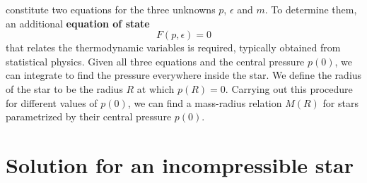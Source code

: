  constitute two equations for the three unknowns $p$, $\epsilon$ and $m$.
To determine them, an additional \textbf{equation of state}
\begin{equation}
	F(p, \epsilon) = 0
\end{equation}
that relates the thermodynamic variables is required, typically obtained from statistical physics.
Given all three equations and the central pressure $p(0)$, we can integrate to find the pressure everywhere inside the star.
We define the radius of the star to be the radius $R$ at which $p(R) = 0$.
Carrying out this procedure for different values of $p(0)$, we can find a mass-radius relation $M(R)$ for stars parametrized by their central pressure $p(0)$.

\section{Solution for an incompressible star}
\label{sec:incompressible_star}


